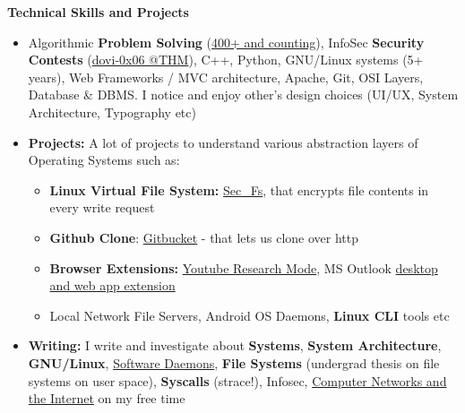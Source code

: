 \documentclass[legalpaper,10pt]{article}
\newcommand{\resheading}[1]{{\large \colorbox{mygrey}{\begin{minipage}{\textwidth}{\textbf{#1 \vphantom{p\^{E}}}}\end{minipage}}}}
\begin{document}
	\resheading{Technical Skills and Projects}
	\begin{itemize}  
		\item Algorithmic \textbf{Problem Solving} (\href{https://www.stopstalk.com/user/profile/ovebepari}{400+ and counting}), InfoSec \textbf{Security Contests} (\href{https://tryhackme.com/p/dovi}{dovi-0x06 @THM}), C++, Python, GNU/Linux systems (5+ years), Web Frameworks / MVC architecture, Apache, Git, OSI Layers, Database \& DBMS. I notice and enjoy other's design choices (UI/UX, System Architecture, Typography etc)
    	 \item \textbf{Projects:} A lot of projects to understand various abstraction layers of Operating Systems such as:
    	    \begin{itemize}
    	        \item \textbf{Linux Virtual File System:}         \href{https://github.com/ovebepari/sec\_fs}{Sec\_Fs}, that encrypts file contents in every write request
    	        \item \textbf{Github Clone}: \href{https://github.com/ovebepari/Github_Clone}{Gitbucket} - that lets us clone over http
    	        \item \textbf{Browser Extensions:} \href{https://github.com/ovebepari/Youtube-Research-Mode}{Youtube Research Mode}, MS Outlook \href{https://github.com/ovebepari/PhishMe}{desktop and web app extension}
    	        \item Local Network File Servers, Android OS Daemons, \textbf{Linux CLI} tools etc
    	    \end{itemize}
		
    	\vspace{0.03in}

		\item \textbf{Writing:} I write and investigate about \textbf{Systems}, \textbf{System Architecture}, \textbf{GNU/Linux}, \href{https://ovebepari.github.io/linux\%7Csystems/docker-socket-tale/}{Software Daemons}, \textbf{File Systems} (undergrad thesis on file systems on user space), \textbf{Syscalls} (strace!), Infosec, \href{https://ovebepari.github.io/Computer-Networking-Series/}{Computer Networks and the Internet} on my free time
		
		\vspace{0.03in}


	\end{itemize}

	\vspace{0.20in}
	
\end{document}
